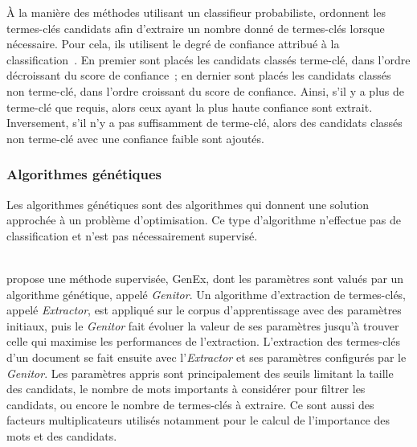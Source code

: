         À la manière des méthodes utilisant un classifieur probabiliste,
         ordonnent les termes-clés candidats
        afin d'extraire un nombre donné de termes-clés lorsque nécessaire. Pour
        cela, ils utilisent le degré de confiance attribué à la
        classification~\cite{denker1991neuralnetprobability}. En premier sont
        placés les candidats classés \og{}terme-clé\fg{}, dans l'ordre
        décroissant du score de confiance~; en dernier sont placés les candidats
        classés \og{}non terme-clé\fg{}, dans l'ordre croissant du score
        de confiance. Ainsi, s'il y a plus de \og{}terme-clé\fg{} que requis,
        alors ceux ayant la plus haute confiance sont extrait. Inversement, s'il
        n'y a pas suffisamment de \og{}terme-clé\fg{}, alors des candidats
        classés \og{}non terme-clé\fg{} avec une confiance faible sont ajoutés.

      \subsubsection{Algorithmes génétiques}
      \label{subsubsec:main-state_of_the_art-automatic_keyphrase_extraction-supervised_keyphrase_extraction-genex}
        Les algorithmes génétiques sont des algorithmes qui donnent une solution
        approchée à un problème d'optimisation. Ce type d'algorithme
        n'effectue pas de classification et n'est pas nécessairement supervisé.

        ~\\ propose une méthode
        supervisée, GenEx, dont les paramètres sont valués par un algorithme
        génétique, appelé \textit{Genitor}. Un algorithme d'extraction de
        termes-clés, appelé \textit{Extractor}, est appliqué sur le corpus
        d'apprentissage avec des paramètres initiaux, puis le \textit{Genitor}
        fait évoluer la valeur de ses paramètres jusqu'à trouver celle qui
        maximise les performances de l'extraction. L'extraction des termes-clés
        d'un document se fait ensuite avec l'\textit{Extractor} et ses
        paramètres configurés par le \textit{Genitor}. Les paramètres appris
        sont principalement des seuils limitant la taille des candidats, le
        nombre de mots importants à considérer pour filtrer les candidats, ou
        encore le nombre de termes-clés à extraire. Ce sont aussi des facteurs
        multiplicateurs utilisés notamment pour le calcul de l'importance des
        mots et des candidats.

